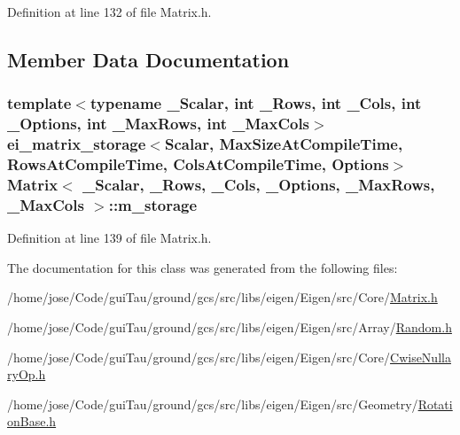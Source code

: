 Definition at line 132 of file Matrix.\-h.



\subsection{Member Data Documentation}
\hypertarget{class_matrix_aeac955d8ec93c6f951886b51a8f85b77}{
\subsubsection[{m\-\_\-storage}]{\setlength{\rightskip}{0pt plus 5cm}template$<$typename \-\_\-\-Scalar, int \-\_\-\-Rows, int \-\_\-\-Cols, int \-\_\-\-Options, int \-\_\-\-Max\-Rows, int \-\_\-\-Max\-Cols$>$ {\bf ei\-\_\-matrix\-\_\-storage}$<${\bf Scalar}, {\bf Max\-Size\-At\-Compile\-Time}, {\bf Rows\-At\-Compile\-Time}, {\bf Cols\-At\-Compile\-Time}, Options$>$ {\bf Matrix}$<$ \-\_\-\-Scalar, \-\_\-\-Rows, \-\_\-\-Cols, \-\_\-\-Options, \-\_\-\-Max\-Rows, \-\_\-\-Max\-Cols $>$\-::m\-\_\-storage\hspace{0.3cm}{\ttfamily [protected]}}}\label{class_matrix_aeac955d8ec93c6f951886b51a8f85b77}


Definition at line 139 of file Matrix.\-h.



The documentation for this class was generated from the following files\-:\begin{DoxyCompactItemize}
\item 
/home/jose/\-Code/gui\-Tau/ground/gcs/src/libs/eigen/\-Eigen/src/\-Core/\hyperlink{_matrix_8h}{Matrix.\-h}\item 
/home/jose/\-Code/gui\-Tau/ground/gcs/src/libs/eigen/\-Eigen/src/\-Array/\hyperlink{_random_8h}{Random.\-h}\item 
/home/jose/\-Code/gui\-Tau/ground/gcs/src/libs/eigen/\-Eigen/src/\-Core/\hyperlink{_cwise_nullary_op_8h}{Cwise\-Nullary\-Op.\-h}\item 
/home/jose/\-Code/gui\-Tau/ground/gcs/src/libs/eigen/\-Eigen/src/\-Geometry/\hyperlink{_rotation_base_8h}{Rotation\-Base.\-h}\end{DoxyCompactItemize}
